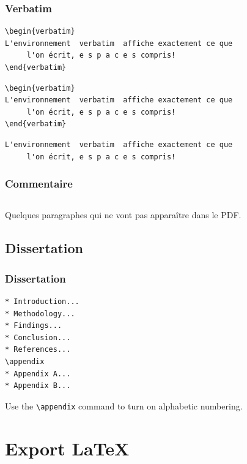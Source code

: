\documentclass[presentation,t,hideothersubsections]{beamer}
\begin{document}
\begin{frame}[fragile]
\frametitle{Verbatim}
\label{sec-3-8-3}



\lstset{language=org}
\begin{lstlisting}
\begin{verbatim}
L'environnement  verbatim  affiche exactement ce que
     l'on écrit, e s p a c e s compris!
\end{verbatim}
\end{lstlisting}


\lstset{language=TeX}
\begin{lstlisting}
\begin{verbatim}
L'environnement  verbatim  affiche exactement ce que
     l'on écrit, e s p a c e s compris!
\end{verbatim}
\end{lstlisting}

\begin{verbatim}
L'environnement  verbatim  affiche exactement ce que
     l'on écrit, e s p a c e s compris!
\end{verbatim}
\end{frame}
\begin{frame}[fragile]
\frametitle{Commentaire}
\label{sec-3-8-4}



\lstset{language=org}
\begin{lstlisting}

\end{lstlisting}

Quelques paragraphes qui ne vont pas apparaître dans le PDF.
\end{frame}
\subsection{Dissertation}
\label{sec-3-9}
\begin{frame}[fragile]
\frametitle{Dissertation}
\label{sec-3-9-1}



\lstset{language=org}
\begin{lstlisting}
* Introduction...
* Methodology...
* Findings...
* Conclusion...
* References...
\appendix
* Appendix A...
* Appendix B...
\end{lstlisting}

Use the \texttt{\textbackslash{}appendix} command to turn on alphabetic numbering.
\end{frame}
\section{Export \LaTeX{}}
\label{sec-4}
\end{document}
